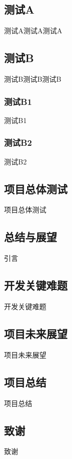 \documentclass[twoside]{CUGThesis}
\begin{document}
	\subsection{测试A}
	测试A测试A测试A
	\subsection{测试B}
	测试B测试B测试B
		\subsubsection{测试B1}
		测试B1
		\subsubsection{测试B2}
		测试B2
	\subsection{项目总体测试}
	项目总体测试

\begin{spacing}{2}
	\section{总结与展望}
\end{spacing}
引言
	\subsection{开发关键难题}
	开发关键难题
	\subsection{项目未来展望}
	项目未来展望
	\subsection{项目总结}
	项目总结

\begin{spacing}{2}
	\section*{致谢}
\end{spacing}
{}

致谢



{}
\end{document}
